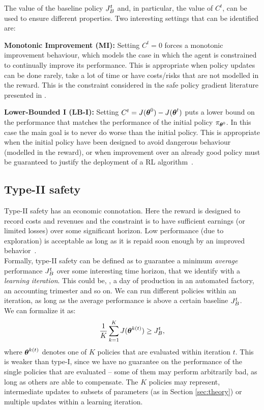 The value of the baseline policy $\jbase[t]$ and, in particular, the value of $C^t$, can be used to ensure different properties. Two interesting settings that can be identified are:

\textbf{Monotonic Improvement (MI):} Setting $C^t= 0$ forces a monotonic improvement behaviour, which models the case in which the agent is constrained to continually improve its performance. This is appropriate when policy updates can be done rarely, take a lot of time or have costs/risks that are not modelled in the reward. This is the constraint considered in the safe policy gradient literature presented in .

\textbf{Lower-Bounded I (LB-I):}
Setting $C^t = J(\vtheta^0) - J(\vtheta^t)$ puts a lower bound on the performance that matches the performance of the initial policy $\pi_{\vtheta^0}$. In this case the main goal is to never do worse than the initial policy. This is appropriate when the initial policy have been designed to avoid dangerous behaviour (modelled in the reward), or when improvement over an already good policy must be guaranteed to justify the deployment of a RL algorithm~\cite{pmlr-v37-thomas15}.



\subsection{Type-II safety}

Type-II safety has an economic connotation. Here the reward is designed to record costs and revenues and the constraint is to have sufficient earnings (or limited losses) over some significant horizon. Low performance (\eg due to exploration) is acceptable as long as it is repaid soon enough by an improved behavior~\cite{adaptive_batch}\cite{pmlr-v37-thomas15}.\\
Formally, type-II safety can be defined as to guarantee a minimum \textit{average} performance $\jbase$ over some interesting time horizon, that we identify with a \textit{learning iteration}. This could be, \eg, a day of production in an automated factory, an accounting trimester and so on. We can run different policies within an iteration, as long as the average performance is above a certain baseline $\jbase$.\\
We can formalize it as: 
\begin{align}\label{con:6}
\frac{1}{K}\sum_{k=1}^{K}J(\vtheta^{k(t)}) \geq \jbase,
\end{align}
where $\vtheta^{k(t)}$ denotes one of $K$ policies that are evaluated within iteration $t$. This is weaker than type-I, since we have no guarantee on the performance of the single policies that are evaluated -- some of them may perform arbitrarily bad, as long as others are able to compensate. The $K$ policies may represent, \eg intermediate updates to subsets of parameters (as in Section \ref{sec:theory}) or multiple updates within a learning iteration. 

